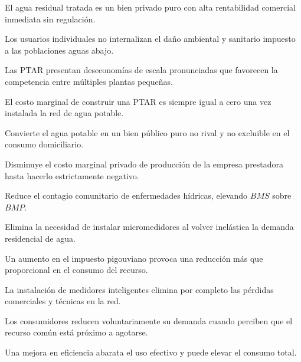 \begin{opts}
    \item El agua residual tratada es un bien privado puro con alta rentabilidad comercial inmediata sin regulación.
    \item Los usuarios individuales no internalizan el daño ambiental y sanitario impuesto a las poblaciones aguas abajo.
    \item Las PTAR presentan deseconomías de escala pronunciadas que favorecen la competencia entre múltiples plantas pequeñas.
    \item El costo marginal de construir una PTAR es siempre igual a cero una vez instalada la red de agua potable.
\end{opts}

\begin{opts}
    \item Convierte el agua potable en un bien público puro no rival y no excluible en el consumo domiciliario.
    \item Disminuye el costo marginal privado de producción de la empresa prestadora hasta hacerlo estrictamente negativo.
    \item Reduce el contagio comunitario de enfermedades hídricas, elevando $BMS$ sobre $BMP$.
    \item Elimina la necesidad de instalar micromedidores al volver inelástica la demanda residencial de agua.
\end{opts}

\begin{opts}
    \item Un aumento en el impuesto pigouviano provoca una reducción más que proporcional en el consumo del recurso.
    \item La instalación de medidores inteligentes elimina por completo las pérdidas comerciales y técnicas en la red.
    \item Los consumidores reducen voluntariamente su demanda cuando perciben que el recurso común está próximo a agotarse.
    \item Una mejora en eficiencia abarata el uso efectivo y puede elevar el consumo total.
\end{opts}

